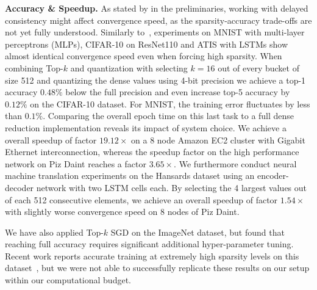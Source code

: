 \documentclass[11pt]{article}
\renewcommand{\paragraph}[1]{\vspace{0.1em} \noindent \textbf{#1}}
\newcommand{\mml}{$\textsc{SparCML}$}
\begin{document}
\paragraph{Accuracy \& Speedup. } As stated by in the preliminaries, working with delayed consistency might affect convergence speed, as the sparsity-accuracy trade-offs are not yet fully understood. Similarly to~\cite{dryden2016communication, aji2017sparse}, experiments on MNIST with multi-layer perceptrons (MLPs), CIFAR-10 on ResNet110 and ATIS with LSTMs show almost identical convergence speed even when forcing high sparsity. When combining Top-$k$ and quantization with selecting $k=16$ out of every bucket of size 512 and quantizing the dense values using 4-bit precision we achieve a top-1 accuracy $0.48\%$ below the full precision and even increase top-5 accuracy by $0.12\%$ on the CIFAR-10 dataset. For MNIST, the training error fluctuates by less than $0.1\%$. Comparing the overall epoch time on this last task to a full dense reduction implementation reveals its impact of system choice. We achieve a overall speedup of factor $\bm{19.12\times}$ on a 8 node Amazon EC2 cluster with Gigabit Ethernet interconnection, whereas the speedup factor on the high performance network on Piz Daint reaches a factor $\bm{3.65\times}$. We furthermore conduct neural machine translation experiments on the Hansards dataset using an encoder-decoder network with two LSTM cells each. By selecting the  4 largest values out of each 512 consecutive elements, we achieve an overall speedup of factor $\bm{1.54\times}$ with slightly worse convergence speed on 8 nodes of Piz Daint.

We have also applied Top-$k$ SGD on the ImageNet dataset, but found that reaching full accuracy requires significant additional hyper-parameter tuning. 
Recent work reports accurate training at extremely high sparsity levels on this dataset~\cite{lin2017deep}, but we were not able to successfully replicate these results on our setup within our computational budget. 

\end{document}
